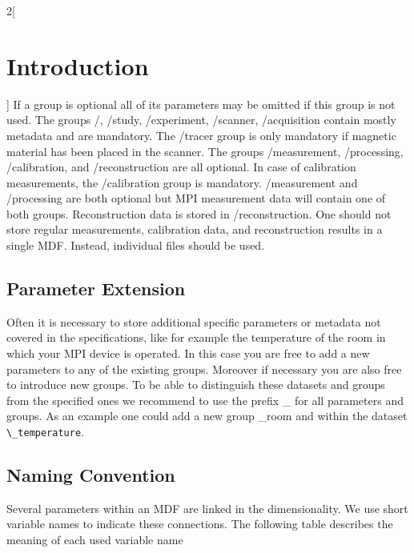 \documentclass[landscape,a4paper]{article} %
\newcommand{\inl}[1]{\lstinline[columns=fixed]{#1}}
\newcommand{\inlvar}[1]{{\ttfamily#1}}
\begin{document}
\begin{multicols}{2}[\section{Introduction} \label{Sec:Introduction}]
If a group is optional all of its parameters may be omitted if this group is not used. The groups \inlvar{/}, \inlvar{/study}, \inlvar{/experiment}, \inlvar{/scanner}, \inlvar{/acquisition} contain mostly metadata and are mandatory. The \inlvar{/tracer} group is only mandatory if magnetic material has been placed in the scanner. The groups \inlvar{/measurement}, \inlvar{/processing}, \inlvar{/calibration}, and \inlvar{/reconstruction} are all optional. In case of calibration measurements, the \inlvar{/calibration} group is mandatory. \inlvar{/measurement} and \inlvar{/processing} are both optional but MPI measurement data will contain one of both groups. Reconstruction data is stored in \inlvar{/reconstruction}. One should not store regular measurements, calibration data, and reconstruction results in a single MDF. Instead, individual files should be used.

\subsection{Parameter Extension}

Often it is necessary to store additional specific parameters or metadata not covered in the specifications, like for example the temperature of the room in which your MPI device is operated. In this case you are free to add a new parameters to any of the existing groups. Moreover if necessary you are also free to introduce new groups. To be able to distinguish these datasets and groups from the specified ones we recommend to use the prefix \inlvar{\_} for all parameters and groups. As an example one could add a new group \inlvar{\_room} and within the dataset \inl{\_temperature}.

\subsection{Naming Convention}

Several parameters within an MDF are linked in the dimensionality. We use short variable names to indicate these connections. The following table describes the meaning of each used variable name



\end{multicols}
\end{document}
